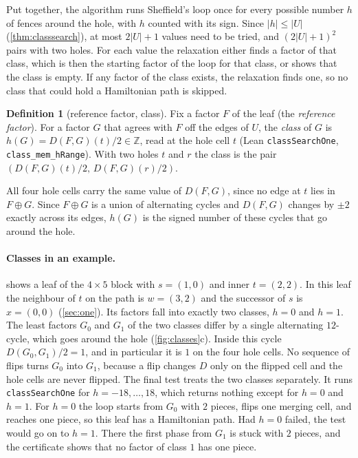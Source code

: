 \documentclass[11pt]{article}
\theoremstyle{plain}
\theoremstyle{definition}
\newtheorem{definition}[theorem]{Definition}
\theoremstyle{remark}
\newcommand{\Z}{\mathbb{Z}}
\newcommand{\lean}[1]{\texttt{#1}}
\begin{document}
Put together, the algorithm runs Sheffield's loop once for every possible number $h$ of fences
around the hole, with $h$ counted with its sign.
Since $|h|\le|U|$ (\cref{thm:classsearch}), at most $2|U|+1$ values need to be tried, and $(2|U|+1)^2$ pairs with two holes.
For each value the relaxation either finds a factor of that class, which is then the starting factor
of the loop for that class, or shows that the class is empty.
If any factor of the class exists, the relaxation finds one, so no class that could hold a
Hamiltonian path is skipped.

\begin{definition}[reference factor, class]
Fix a factor $F$ of the leaf (the \emph{reference factor}).
For a factor $G$ that agrees with $F$ off the edges of $U$, the \emph{class} of $G$ is
$h(G)=D(F,G)(t)/2\in\Z$, read at the hole cell $t$ (Lean \lean{classSearchOne}, \lean{class\_mem\_hRange}).
With two holes $t$ and $r$ the class is the pair $(D(F,G)(t)/2,\,D(F,G)(r)/2)$.
\end{definition}

All four hole cells carry the same value of $D(F,G)$, since no edge at $t$ lies in $F\oplus G$.
Since $F\oplus G$ is a union of alternating cycles and $D(F,G)$ changes by $\pm2$ exactly across
its edges, $h(G)$ is the signed number of these cycles that go around the hole.

\paragraph{Classes in an example.}
 shows a leaf of the $4\times5$ block with $s=(1,0)$ and inner $t=(2,2)$.
In this leaf the neighbour of $t$ on the path is $w=(3,2)$ and the successor of $s$ is $x=(0,0)$
(\cref{sec:one}).
Its factors fall into exactly two classes, $h=0$ and $h=1$.
The least factors $G_0$ and $G_1$ of the two classes differ by a single alternating $12$-cycle, which
goes around the hole (\cref{fig:classes}c).
Inside this cycle $D(G_0,G_1)/2=1$, and in particular it is $1$ on the four hole cells.
No sequence of flips turns $G_0$ into $G_1$, because a flip changes $D$ only on the flipped cell and
the hole cells are never flipped.
The final test treats the two classes separately.
It runs \lean{classSearchOne} for $h=-18,\dots,18$, which returns nothing except for $h=0$ and $h=1$.
For $h=0$ the loop starts from $G_0$ with $2$ pieces, flips one merging cell, and reaches one piece,
so this leaf has a Hamiltonian path.
Had $h=0$ failed, the test would go on to $h=1$.
There the first phase from $G_1$ is stuck with $2$ pieces, and the certificate shows that no factor
of class $1$ has one piece.
\end{document}
